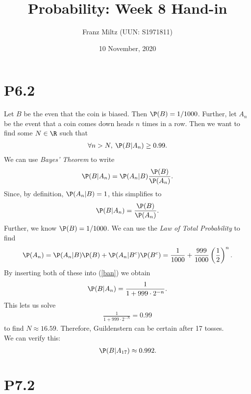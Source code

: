 \documentclass{article}
\begin{document}
\title{Probability: Week 8 Hand-in}
\author{Franz Miltz (UUN: S1971811)}
\date{10 November, 2020}
\maketitle


\section*{P6.2}


Let $B$ be the even that the coin is biased. Then $\P(B)=1/1000$. Further,
let $A_n$ be the event that a coin comes down heads $n$ times in a row.
Then we want to find some $N\in\R$ such that
\begin{align*}
  \forall n > N,\: \P(B|A_n)\geq 0.99.
\end{align*}
We can use \emph{Bayes' Theorem} to write
\begin{align*}
  \P(B|A_n) = \P(A_n|B)\frac{\P(B)}{\P(A_n)}.
\end{align*}
Since, by definition, $\P(A_n|B)=1$, this simplifies to
\begin{align}
  \label{ban}
  \P(B|A_n) = \frac{\P(B)}{\P(A_n)}.
\end{align}
Further, we know $\P(B)=1/1000$. We can use the \emph{Law of Total
  Probability} to find
\begin{align*}
  \P(A_n)=\P(A_n|B)\P(B) + \P(A_n|B^c)\P(B^c)
  =\frac{1}{1000}+\frac{999}{1000}\left(\frac{1}{2}\right)^n.
\end{align*}
By inserting both of these into (\ref{ban}) we obtain
\begin{align*}
  \P(B|A_n) = \frac{1}{1+999\cdot 2^{-n}}.
\end{align*}
This lets us solve
\begin{align*}
  \frac{1}{1+999\cdot 2^{-N}} = 0.99
\end{align*}
to find $N\approx 16.59$. Therefore, Guildenstern can be certain after
17 tosses.\\
We can verify this:
\begin{align*}
  \P(B|A_{17}) \approx 0.992.
\end{align*}


\section*{P7.2}
\end{document}

